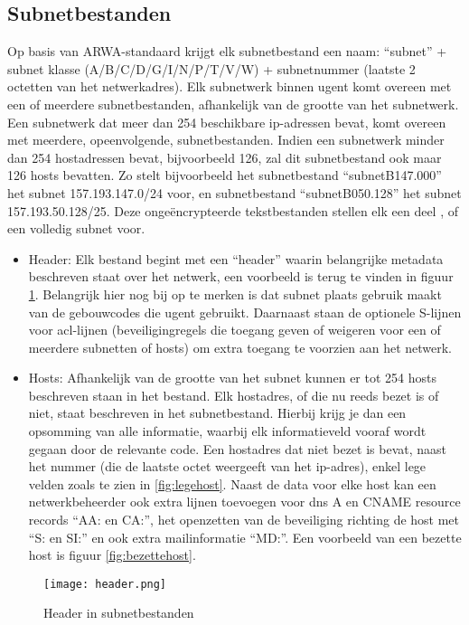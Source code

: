 \subsection{Subnetbestanden}
\label{subnetbestanden}
Op basis van ARWA-standaard krijgt elk subnetbestand een naam: “subnet” + subnet klasse (A/B/C/D/G/I/N/P/T/V/W) + subnetnummer (laatste 2 octetten van het netwerkadres). Elk subnetwerk binnen \acrshort{ugent} komt overeen met een of meerdere subnetbestanden, afhankelijk van de grootte van het subnetwerk. Een subnetwerk dat meer dan 254 beschikbare \acrshort{ip}-adressen bevat, komt overeen met meerdere, opeenvolgende, subnetbestanden. Indien een subnetwerk minder dan 254 hostadressen bevat, bijvoorbeeld 126, zal dit subnetbestand ook maar 126 hosts bevatten.
Zo stelt bijvoorbeeld het subnetbestand “subnetB147.000” het subnet 157.193.147.0/24 voor, en subnetbestand “subnetB050.128” het subnet 157.193.50.128/25. Deze ongeëncrypteerde tekstbestanden stellen elk een deel , of een volledig subnet voor.
\begin{itemize}
    \item Header: Elk bestand begint met een “header” waarin belangrijke metadata beschreven staat over het netwerk, een voorbeeld is terug te vinden in figuur \ref{fig:header}. Belangrijk hier nog bij op te merken is dat subnet plaats gebruik maakt van de gebouwcodes die \acrshort{ugent} gebruikt. Daarnaast staan de optionele S-lijnen voor \acrfull{acl}-lijnen (beveiligingregels die toegang geven of weigeren voor een of meerdere subnetten of hosts) om extra toegang te voorzien aan het netwerk. 
    \item Hosts: Afhankelijk van de grootte van het subnet kunnen er tot 254 hosts beschreven staan in het bestand. Elk hostadres, of die nu reeds bezet is of niet, staat beschreven in het subnetbestand. Hierbij krijg je dan een opsomming van alle informatie, waarbij elk informatieveld vooraf wordt gegaan door de relevante code. Een hostadres dat niet bezet is bevat, naast het nummer (die de laatste octet weergeeft van het \acrshort{ip}-adres), enkel lege velden zoals te zien in \ref{fig:legehost}. Naast de data voor elke host kan een netwerkbeheerder ook extra lijnen toevoegen voor \acrshort{dns} A en CNAME resource records “AA: en CA:”, het openzetten van de beveiliging richting de host met “S: en SI:” en ook extra mailinformatie “MD:”. Een voorbeeld van een bezette host is figuur \ref{fig:bezettehost}.
\end{itemize}

\begin{figure}[H]
    \texttt{[image: header.png]}
    \caption{Header in subnetbestanden}
    \label{fig:header}
\end{figure}

